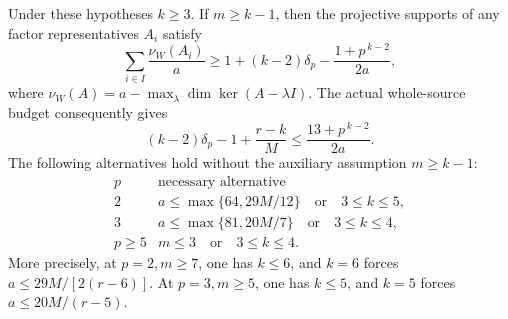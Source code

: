 \begin{theorem}[D-TD57]
Under these hypotheses \(k\ge3\).  If \(m\ge k-1\), then the
projective supports of any factor representatives \(A_i\) satisfy
\[
 \sum_{i\in I}\frac{\nu_W(A_i)}a
 \ge
 1+(k-2)\delta_p-\frac{1+p^{\,k-2}}{2a},
 \tag{HRC.4}
\]
where \(\nu_W(A)=a-\max_\lambda\dim\ker(A-\lambda I)\).
The actual whole-source budget consequently gives
\[
 (k-2)\delta_p-1+\frac{r-k}{M}
                  \le\frac{13+p^{\,k-2}}{2a}.
 \tag{HRC.5}
\]
The following alternatives hold without the auxiliary assumption
\(m\ge k-1\):
\[
 \begin{array}{c|c}
 p&\text{necessary alternative}\\ \hline
 2&
 a\le\max\{64,29M/12\}\quad\text{or}\quad 3\le k\le5,\\[2pt]
 3&
 a\le\max\{81,20M/7\}\quad\text{or}\quad 3\le k\le4,\\[2pt]
 p\ge5&
 m\le3\quad\text{or}\quad 3\le k\le4.
 \end{array}
 \tag{HRC.6}
\]
More precisely, at \(p=2,m\ge7\), one has \(k\le6\), and
\(k=6\) forces \(a\le29M/[2(r-6)]\).
At \(p=3,m\ge5\), one has \(k\le5\), and
\(k=5\) forces \(a\le20M/(r-5)\).
\end{theorem}

